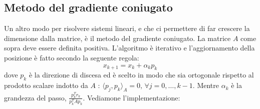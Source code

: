 \documentclass[10pt,a4paper]{article}
\begin{document}
\subsection{Metodo del gradiente coniugato}
Un altro modo per risolvere sistemi lineari, e che ci permettere di far crescere la dimensione dalla matrice, è il metodo del gradiente coniugato. La matrice $A$ come sopra deve essere definita positiva.
L'algoritmo è iterativo e l'aggiornamento della posizione è fatto secondo la seguente regola:
\begin{equation}
x_{k+1} = x_k + \alpha_k p_k
\end{equation}  
dove $p_k$ è la direzione di discesa ed è scelto in modo che sia ortogonale rispetto al prodotto scalare indotto da $A$ : $ \langle p_j, p_k\rangle_A = 0,\, \forall j=0,\dots,k-1$. Mentre $\alpha_k$ è la grandezza del passo, $\frac{p_k^T r_k}{p_k^T A p_k}$. Vediamone l'implementazione:
\end{document}
